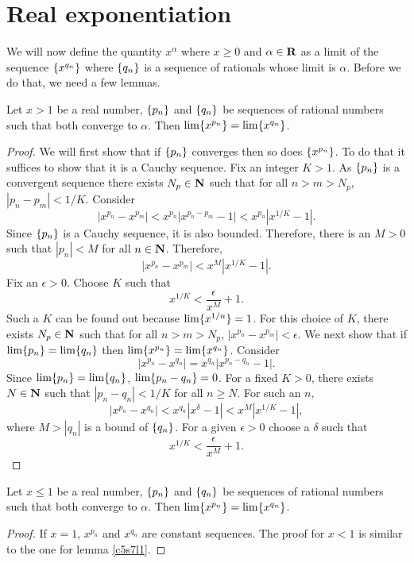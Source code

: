 \section{Real exponentiation}\label{c5s7}
We will now define the quantity $x^\alpha$ where $x \ge 0$ and $\alpha \in
\mathbf{R}$ as a limit of the sequence $\{x^{q_n}\}$ where $\{q_n\}$ is a
sequence of rationals whose limit is $\alpha$. Before we do that, we need a 
few lemmas.
\begin{lem}\label{c5s7l1}
Let $x > 1$ be a real number, $\{p_n\}$ and $\{q_n\}$ be sequences of
rational numbers such that both converge to $\alpha$. Then 
$\lim\{x^{p_n}\} = \lim\{x^{q_n}\}$.
\end{lem}
\begin{proof}
We will first show that if $\{p_n\}$ converges then so does 
$\{x^{p_n}\}$. To do that it suffices to show that it is a Cauchy 
sequence. Fix an integer $K > 1$. As $\{p_n\}$ is a convergent sequence
there exists $N_p \in \mathbf{N}$ such that for all $n > m > N_p$, $|p_n - p_m|
< 1/K$. Consider
\[
|x^{p_n} - x^{p_m}| < x^{p_n}|x^{p_n - p_m} - 1| < x^{p_n}|x^{1/K} - 1|.
\]
Since $\{p_n\}$ is a Cauchy sequence, it is also bounded. Therefore, there
is an $M > 0$ such that $|p_n| < M$ for all $n \in \mathbf{N}$. Therefore,
\[
|x^{p_n} - x^{p_m}| < x^M|x^{1/K} - 1|.
\]
Fix an $\epsilon > 0$. Choose $K$ such that
\[
x^{1/K} < \frac{\epsilon}{x^M} + 1.
\]
Such a $K$ can be found out because $\lim\{x^{1/n}\} = 1$. For this choice
of $K$, there exists $N_p \in \mathbf{N}$ such that for all $n > m > N_p$, 
$|x^{p_n} - x^{p_m}| < \epsilon$. We next show that if $\lim\{p_n\} = 
\lim\{q_n\}$ then $\lim\{x^{p_n}\} = \lim\{x^{q_n}\}$. Consider
\[
|x^{p_n} - x^{q_n}| = x^{q_n}|x^{p_n - q_n} - 1|.
\]
Since $\lim\{p_n\} = \lim\{q_n\}$, $\lim\{p_n - q_n\} = 0$. For a
fixed $K > 0$, there exists $N \in \mathbf{N}$ such that $|p_n - q_n| <
1/K$ for all $n \ge N$. For such an $n$,
\[
|x^{p_n} - x^{q_n}| < x^{q_n}|x^\delta - 1| < x^M|x^{1/K} - 1|,
\]
where $M > |q_n|$ is a bound of $\{q_n\}$. For a given $\epsilon > 0$
choose a $\delta$ such that
\[
x^{1/K} < \frac{\epsilon}{x^M} + 1.
\]
\end{proof}

\begin{lem}\label{c5s7l2}
Let $x \le 1$ be a real number, $\{p_n\}$ and $\{q_n\}$ be sequences of
rational numbers such that both converge to $\alpha$. Then 
$\lim\{x^{p_n}\} = \lim\{x^{q_n}\}$.
\end{lem}
\begin{proof}
If $x = 1$, $x^{p_n}$ and $x^{q_n}$ are constant sequences. The proof for
$x < 1$ is similar to the one for lemma \ref{c5s7l1}.
\end{proof}

